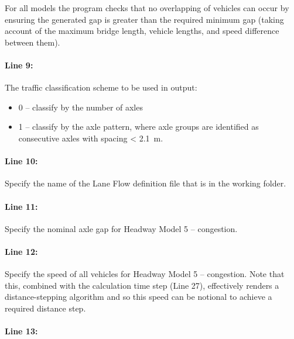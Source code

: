 \documentclass[
]{article}
\begin{document}
For all models the program checks that no overlapping of vehicles can
occur by ensuring the generated gap is greater than the required minimum
gap (taking account of the maximum bridge length, vehicle lengths, and
speed difference between them).

\paragraph*{Line 9:}\label{line-9}

The traffic classification scheme to be used in output:

\begin{itemize}
\item
  0 -- classify by the number of axles
\item
  1 -- classify by the axle pattern, where axle groups are identified as
  consecutive axles with spacing \textless{} 2.1~m.
\end{itemize}

\paragraph*{Line 10:}\label{line-10}

Specify the name of the Lane Flow definition file that is in the working
folder.

\paragraph*{Line 11:}\label{line-11}

Specify the nominal axle gap for Headway Model 5 -- congestion.

\paragraph*{Line 12:}\label{line-12}

Specify the speed of all vehicles for Headway Model 5 -- congestion.
Note that this, combined with the calculation time step (Line 27),
effectively renders a distance-stepping algorithm and so this speed can
be notional to achieve a required distance step.

\paragraph*{Line 13:}\label{line-13}
\end{document}
